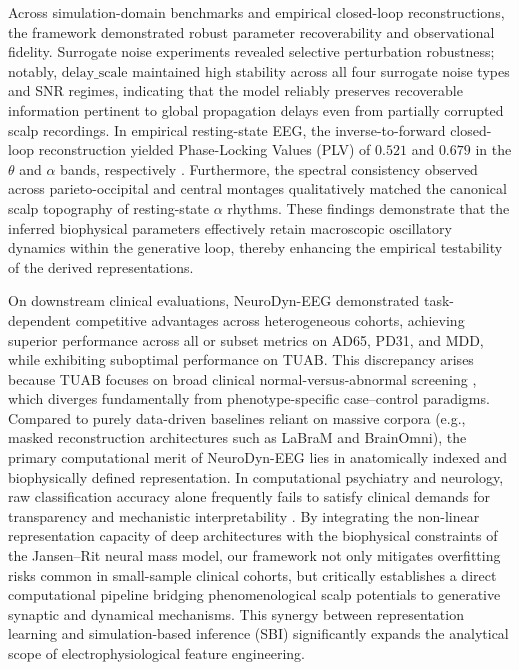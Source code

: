 \documentclass{article}
\begin{document}
{Across simulation-domain benchmarks and empirical closed-loop reconstructions, the framework demonstrated robust parameter recoverability and observational fidelity. Surrogate noise experiments revealed selective perturbation robustness; notably, $\mathrm{delay\_scale}$ maintained high stability across all four surrogate noise types and SNR regimes, indicating that the model reliably preserves recoverable information pertinent to global propagation delays even from partially corrupted scalp recordings. In empirical resting-state EEG, the inverse-to-forward closed-loop reconstruction yielded Phase-Locking Values (PLV) of $0.521$ and $0.679$ in the $\theta$ and $\alpha$ bands, respectively \citep{lachaux1999measuring}. Furthermore, the spectral consistency observed across parieto-occipital and central montages qualitatively matched the canonical scalp topography of resting-state $\alpha$ rhythms. These findings demonstrate that the inferred biophysical parameters effectively retain macroscopic oscillatory dynamics within the generative loop, thereby enhancing the empirical testability of the derived representations.

On downstream clinical evaluations, NeuroDyn-EEG demonstrated task-dependent competitive advantages across heterogeneous cohorts, achieving superior performance across all or subset metrics on AD65, PD31, and MDD, while exhibiting suboptimal performance on TUAB. This discrepancy arises because TUAB focuses on broad clinical normal-versus-abnormal screening \citep{obeid2016tuh}, which diverges fundamentally from phenotype-specific case--control paradigms. Compared to purely data-driven baselines reliant on massive corpora (e.g., masked reconstruction architectures such as LaBraM and BrainOmni), the primary computational merit of NeuroDyn-EEG lies in anatomically indexed and biophysically defined representation. In computational psychiatry and neurology, raw classification accuracy alone frequently fails to satisfy clinical demands for transparency and mechanistic interpretability \citep{rudin2019stop}. By integrating the non-linear representation capacity of deep architectures with the biophysical constraints of the Jansen--Rit neural mass model, our framework not only mitigates overfitting risks common in small-sample clinical cohorts, but critically establishes a direct computational pipeline bridging phenomenological scalp potentials to generative synaptic and dynamical mechanisms. This synergy between representation learning and simulation-based inference (SBI) \citep{goncalves2020training} significantly expands the analytical scope of electrophysiological feature engineering.

}
\end{document}
